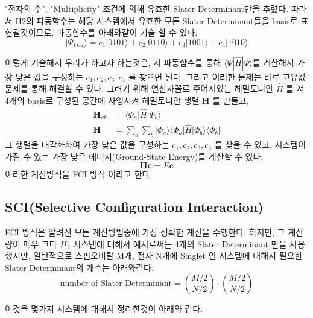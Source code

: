 \documentclass[11pt]{article}
\begin{document}
"전자의 수", "Multiplicity" 조건에 의해 유효한 Slater Determinant만을 추렸다. 따라서 H2의 파동함수는 해당 시스템에서 유효한 모든 Slater Determinant들을 basis로 표현될것이므로, 
파동함수를 아래와같이 기술 할 수 있다. 
\[
|\Psi_{FCI} \rangle = c_1|0101\rangle + c_2|0110\rangle + c_3|1001\rangle+ c_4|1010\rangle
\]

이렇게 기술해서 우리가 하고자 하는것은, 저 파동함수를 통해 \(\langle \Psi|\hat{H}|\Psi \rangle\)를 계산해서 가장 낮은 값을 구성하는 \(c_1, c_2, c_3, c_4 \) 를 찾으면 된다.
그리고 이러한 문제는 바로 고유값 문제를 통해 해결할 수 있다. 
그러기 위해 연산자꼴로 주어져있는 헤밀토니안 \(\hat{H}\) 를 저 4개의 basis로 구성된 공간에 사영시켜 헤밀토니안 행렬 \(\mathbf{H}\) 를 만들고, 
\begin{align*}
\mathbf{H}_{ab} &= \langle \Phi_a \vert \hat{H} \vert \Phi_b \rangle \\
\mathbf{H} &= \sum_a \sum_b \vert \Phi_a \rangle \langle \Phi_a \vert \hat{H} \vert \Phi_b \rangle \langle \Phi_b \vert
\end{align*}
그 행렬을 대각화하여 가장 낮은 값을 구성하는 \(c_1, c_2, c_3, c_4 \) 를 찾을 수 있고, 시스템이 가질 수 있는 가장 낮은 에너지(Ground-State Energy)를 계산할 수 있다. 
\[
\mathbf{H}\mathbf{c} = E\mathbf{c}
\]
이러한 계산방식을 FCI 방식 이라고 한다. 

\subsection{SCI(Selective Configuration Interaction)}
FCI 방식은 알려진 모든 계산방법중에 가장 정확한 계산을 수행한다. 하지만, 그 계산량이 매우 크다 \(H_2\) 시스템에 대해서 예시로써는 4개의 Slater Determinant 만을 사용했지만, 
일반적으로 스핀오비탈 M개, 전자 N개에 Singlet 인 시스템에 대해서 필요한 Slater Determinant의 개수는 아래와같다. 
\[
\text{number of Slater Determinant} = \binom{M/2}{N/2}\cdot\binom{M/2}{N/2}
\]

이것을 몇가지 시스템에 대해서 정리한것이 아래와 같다. 
\end{document}
